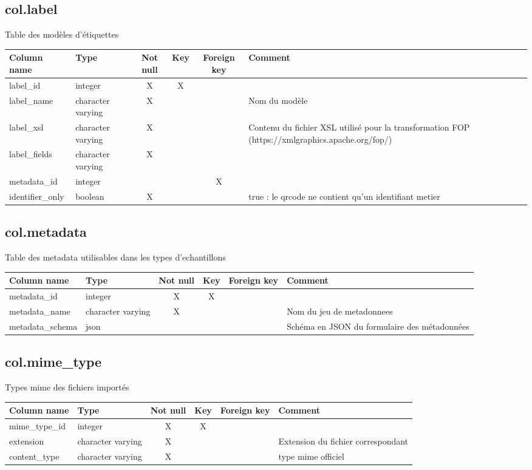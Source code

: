 \subsection{col.label}
Table des modèles d'étiquettes

\begin{tabular}{|l| p{2cm}|c|c|c| p{3cm}|}
\hline
Column name & Type & Not null & Key & Foreign key & Comment \\
\hline
label\_id & integer & X & X & & \\
\hline
label\_name & character varying & X & & & Nom du modèle\\
\hline
label\_xsl & character varying & X & & & Contenu du fichier XSL utilisé pour la transformation FOP (https://xmlgraphics.apache.org/fop/)\\
\hline
label\_fields & character varying & X & & & \\
\hline
metadata\_id & integer & & & X & \\
\hline
identifier\_only & boolean & X & & & true : le qrcode ne contient qu'un identifiant metier\\
\hline
\end{tabular}
\subsection{col.metadata}
Table des metadata utilisables dans les types d'echantillons

\begin{tabular}{|l| p{2cm}|c|c|c| p{3cm}|}
\hline
Column name & Type & Not null & Key & Foreign key & Comment \\
\hline
metadata\_id & integer & X & X & & \\
\hline
metadata\_name & character varying & X & & & Nom du jeu de metadonnees\\
\hline
metadata\_schema & json & & & & Schéma en JSON du formulaire des métadonnées\\
\hline
\end{tabular}
\subsection{col.mime\_type}
Types mime des fichiers importés

\begin{tabular}{|l| p{2cm}|c|c|c| p{3cm}|}
\hline
Column name & Type & Not null & Key & Foreign key & Comment \\
\hline
mime\_type\_id & integer & X & X & & \\
\hline
extension & character varying & X & & & Extension du fichier correspondant\\
\hline
content\_type & character varying & X & & & type mime officiel\\
\hline
\end{tabular}
